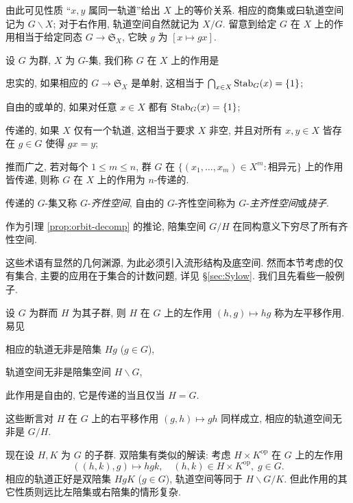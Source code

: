 由此可见性质 ``$x,y$ 属同一轨道''给出 $X$ 上的等价关系. 相应的商集或曰轨道空间记为 $G \backslash X$; 对于右作用, 轨道空间自然就记为 $X/G$. 留意到给定 $G$ 在 $X$ 上的作用相当于给定同态 $G \to \mathfrak{S}_X$, 它映 $g$ 为 $[x \mapsto gx]$.
\begin{definition}
	设 $G$ 为群, $X$ 为 $G$-集, 我们称 $G$ 在 $X$ 上的作用是 
	\begin{compactitem}
		\item 忠实的, 如果相应的 $G \to \mathfrak{S}_X$ 是单射, 这相当于 $\bigcap_{x \in X} \operatorname{Stab}_G(x) = \{1\}$;
		\item 自由的或单的, 如果对任意 $x \in X$ 都有 $\operatorname{Stab}_G(x) = \{1\}$;
		\item 传递的, 如果 $X$ 仅有一个轨道, 这相当于要求 $X$ 非空, 并且对所有 $x, y \in X$ 皆存在 $g \in G$ 使得 $gx=y$;
		\item 推而广之, 若对每个 $1 \leq m \leq n$, 群 $G$ 在 $\{ (x_1, \ldots, x_m) \in X^m: \text{相异元} \}$ 上的作用皆传递, 则称 $G$ 在 $X$ 上的作用为 $n$-传递的.
	\end{compactitem}

	传递的 $G$-集又称 $G$-\emph{齐性空间}, 自由的 $G$-齐性空间称为 $G$-\emph{主齐性空间}或\emph{挠子}.
\end{definition}
作为引理 \ref{prop:orbit-decomp} 的推论, 陪集空间 $G/H$ 在同构意义下穷尽了所有齐性空间.

这些术语有显然的几何渊源, 为此必须引入流形结构及底空间. 然而本节考虑的仅有集合, 主要的应用在于集合的计数问题, 详见 \S\ref{sec:Sylow}.  我们且先看些一般例子.

\begin{example}[平移作用与陪集]
	设 $G$ 为群而 $H$ 为其子群, 则 $H$ 在 $G$ 上的左作用 $(h, g) \mapsto hg$ 称为左平移作用. 易见
	\begin{inparaenum}[(i)]
		\item 相应的轨道无非是陪集 $Hg$ ($g \in G$),
		\item 轨道空间无非是陪集空间 $H \backslash G$,
		\item 此作用是自由的, 它是传递的当且仅当 $H=G$.
	\end{inparaenum}
	这些断言对 $H$ 在 $G$ 上的右平移作用 $(g,h) \mapsto gh$ 同样成立, 相应的轨道空间无非是 $G/H$.

	现在设 $H, K$ 为 $G$ 的子群. 双陪集有类似的解读: 考虑 $H \times K^\text{op}$ 在 $G$ 上的左作用
	\[ ((h, k), g) \mapsto hgk, \quad (h, k) \in H \times K^\text{op}, \; g \in G. \]
	相应的轨道正好是双陪集 $HgK$ ($g \in G$), 轨道空间等同于 $H \backslash G/K$. 但此作用的其它性质则远比左陪集或右陪集的情形复杂.
\end{example}

